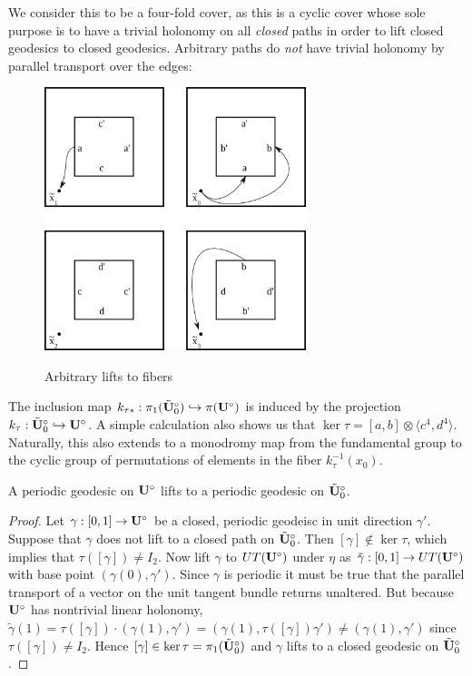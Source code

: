 \documentclass[]{article}
\def\btUos{\btU_0^\circ}
\def\<{\langle} \def\>{\rangle}
\begin{document}
We consider this to be a four-fold cover, as this is a cyclic cover whose sole purpose is to have a trivial holonomy on all \emph{closed} paths in order to lift closed geodesics to closed geodesics. Arbitrary paths do \emph{not} have trivial holonomy by parallel transport over the edges:
\begin{figure}[H]
\centering
\includegraphics[width=3in]{monogroup.png}
\label{fig:arbitrarylift}
\caption{Arbitrary lifts to fibers }
\end{figure}
The inclusion map $k_{\tau*}:\pi_1(\btUos)\hookrightarrow\pi(\bUs)$ is induced by the projection $k_{\tau}:\btUos\hookrightarrow\bUs$.
A simple calculation also shows us that $\ker\tau=[a,b]\otimes\<c^4,d^4\>$. Naturally, this also extends to a monodromy map from the fundamental group to the cyclic group of permutations of elements in the fiber $k^{-1}_{\tau}(x_0)$.
\begin{thm}
A periodic geodesic on $\mathbf{U}^\circ$ lifts to a periodic geodesic on $\btUos$.
\begin{proof}
Let $\gamma:[0,1]\rightarrow \mathbf{U}^\circ$ be a closed, periodic geodeisc in unit direction $\gamma'$. Suppose that $\gamma$ does not lift to a closed path on $\btUos$. Then $[\gamma]\notin\ker\tau$, which implies that $\tau([\gamma])\neq I_2$. Now lift $\gamma$ to $UT(\mathbf{U}^\circ)$ under $\eta$ as $\tilde{\gamma}:[0,1]\rightarrow UT(\mathbf{U}^\circ)$ with base point $(\gamma(0),\gamma')$. Since $\gamma$ is periodic it must be true that the parallel transport of a vector on the unit tangent bundle returns unaltered. But because $\mathbf{U}^\circ$ has nontrivial linear holonomy, $\tilde{\gamma}(1)=\tau([\gamma])\cdot(\gamma(1),\gamma')=(\gamma(1),\tau([\gamma])\gamma')\neq (\gamma(1),\gamma')$ since $\tau([\gamma])\neq I_2$. Hence $[\gamma]\in\ker\tau=\pi_1(\btUos)$ and $\gamma$ lifts to a closed geodesic on $\btUos$.
\end{proof}
\end{thm}
\end{document}
